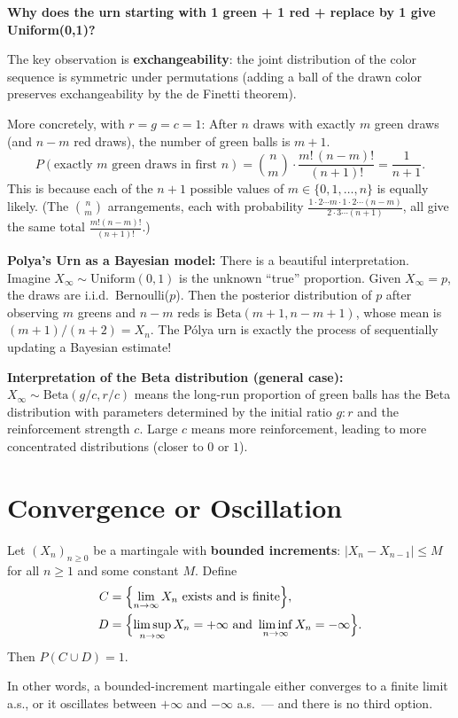 \documentclass[12pt]{article}
\newcommand{\1}{\mathbf{1}}
\begin{document}
\begin{tcolorbox}[bluebox={Detailed Explanation of the Uniform Case}]
\textbf{Why does the urn starting with 1 green + 1 red + replace by 1 give Uniform(0,1)?}

The key observation is \textbf{exchangeability}: the joint distribution of the color
sequence is symmetric under permutations (adding a ball of the drawn color preserves
exchangeability by the de Finetti theorem).

\medskip
More concretely, with $r = g = c = 1$:  After $n$ draws with exactly $m$ green draws
(and $n-m$ red draws), the number of green balls is $m + 1$.
\[
  P(\text{exactly } m \text{ green draws in first } n) = \binom{n}{m} \cdot \frac{m!\,(n-m)!}{(n+1)!} = \frac{1}{n+1}.
\]
This is because each of the $n+1$ possible values of $m \in \{0,1,\ldots,n\}$ is
equally likely.  (The $\binom{n}{m}$ arrangements, each with probability
$\frac{1 \cdot 2 \cdots m \cdot 1 \cdot 2 \cdots (n-m)}{2 \cdot 3 \cdots (n+1)}$,
all give the same total $\frac{m!(n-m)!}{(n+1)!}$.)

\medskip
\textbf{Polya's Urn as a Bayesian model:} There is a beautiful interpretation.
Imagine $X_\infty \sim \text{Uniform}(0,1)$ is the unknown ``true'' proportion.
Given $X_\infty = p$, the draws are i.i.d.\ Bernoulli($p$).  Then the posterior
distribution of $p$ after observing $m$ greens and $n-m$ reds is
$\text{Beta}(m+1, n-m+1)$, whose mean is $(m+1)/(n+2) = X_n$.
The Pólya urn is exactly the process of sequentially updating a Bayesian estimate!

\medskip
\textbf{Interpretation of the Beta distribution (general case):}
$X_\infty \sim \text{Beta}(g/c, r/c)$ means the long-run proportion of green balls
has the Beta distribution with parameters determined by the initial ratio $g:r$ and
the reinforcement strength $c$.  Large $c$ means more reinforcement, leading to more
concentrated distributions (closer to $0$ or $1$).
\end{tcolorbox}

\section{Convergence or Oscillation}

\begin{tcolorbox}[redbox={Theorem 4.3.1 (Convergence or Oscillation)}]
Let $(X_n)_{n \ge 0}$ be a martingale with \textbf{bounded increments}:
$|X_n - X_{n-1}| \le M$ for all $n \ge 1$ and some constant $M$.  Define
\begin{align*}
  C &= \Bigl\{\lim_{n \to \infty} X_n \text{ exists and is finite}\Bigr\}, \\
  D &= \Bigl\{\limsup_{n\to\infty} X_n = +\infty \text{ and } \liminf_{n\to\infty} X_n = -\infty\Bigr\}.
\end{align*}
Then $P(C \cup D) = 1$.

In other words, a bounded-increment martingale either converges to a finite limit a.s.,
or it oscillates between $+\infty$ and $-\infty$ a.s.\ --- and there is no third option.
\end{tcolorbox}
\end{document}
